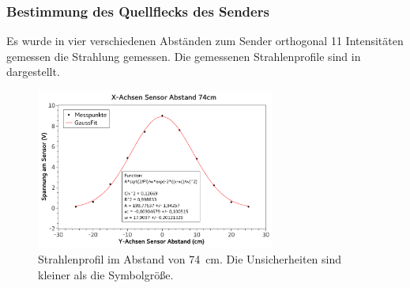 \documentclass[
	a4paper,
	12pt,
	pagesize,
	ngerman
]{scrartcl}
\begin{document}
	\subsubsection{Bestimmung des Quellflecks des Senders}
	Es wurde in vier verschiedenen Abständen zum Sender orthogonal 11 Intensitäten gemessen die Strahlung gemessen.
	Die gemessenen Strahlenprofile sind in  dargestellt. 
	\begin{figure}[H] %
		\includegraphics[width=0.7\textwidth]{fig_74cm_gauss}
		\centering
		\caption{Strahlenprofil im Abstand von \SI{74}{cm}. Die Unsicherheiten sind kleiner als die Symbolgröße.}
		\label{fig_74cm}
		\centering
	\end{figure}
\end{document}

